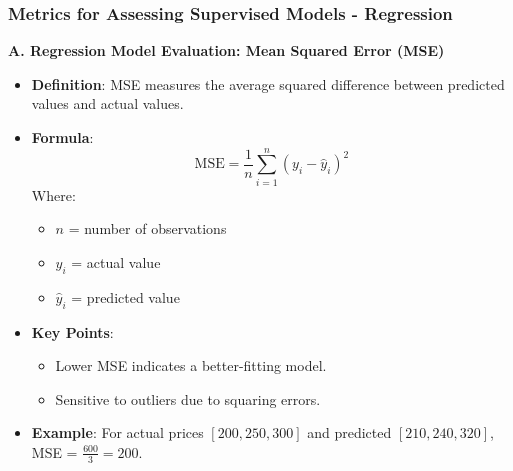\documentclass[aspectratio=169]{beamer}
\begin{document}
\begin{frame}[fragile]
    \frametitle{Metrics for Assessing Supervised Models - Regression}

    \textbf{A. Regression Model Evaluation: Mean Squared Error (MSE)}
    
    \begin{itemize}
        \item \textbf{Definition}: MSE measures the average squared difference between predicted values and actual values.
        \item \textbf{Formula}:
        \begin{equation}
            \text{MSE} = \frac{1}{n} \sum_{i=1}^{n} (y_i - \hat{y}_i)^2
        \end{equation}
        Where: 
        \begin{itemize}
            \item $n$ = number of observations
            \item $y_i$ = actual value
            \item $\hat{y}_i$ = predicted value
        \end{itemize}
        
        \item \textbf{Key Points}:
        \begin{itemize}
            \item Lower MSE indicates a better-fitting model.
            \item Sensitive to outliers due to squaring errors.
        \end{itemize}
        
        \item \textbf{Example}: For actual prices \([200, 250, 300]\) and predicted \([210, 240, 320]\),
        MSE = \(\frac{600}{3} = 200\).
    \end{itemize}
\end{frame}
\end{document}
